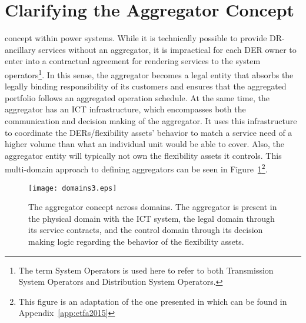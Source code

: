 \section{Clarifying the Aggregator Concept}
 concept within power systems. While it is technically possible to provide DR-ancillary services without an aggregator, it is impractical for each DER owner to enter into a contractual agreement for rendering services to the system operators\footnote{The term System Operators is used here to refer to both Transmission System Operators and Distribution System Operators.}. In this sense, the aggregator becomes a legal entity that absorbs the legally binding responsibility of its customers and ensures that the aggregated portfolio follows an aggregated operation schedule. At the same time, the aggregator has an ICT infrastructure, which encompasses both the communication and decision making of the aggregator. It uses this infrastructure to coordinate the DERs/flexibility assets' behavior to match a service need of a higher volume than what an individual unit would be able to cover. Also, the aggregator entity will typically not own the flexibility assets it controls. This multi-domain approach to defining aggregators can be seen in Figure~\ref{fig:MAINdomains}\footnote{This figure is an adaptation of the one presented in \cite{bondy2015a} which can be found in Appendix~\ref{app:etfa2015}}.

\begin{figure}[htbp!]
\centering
\texttt{[image: domains3.eps]}
\caption{The aggregator concept across domains. The aggregator is present in the physical domain with the ICT system, the legal domain through its service contracts, and the control domain through its decision making logic regarding the behavior of the flexibility assets.}
\label{fig:MAINdomains}
\end{figure}

